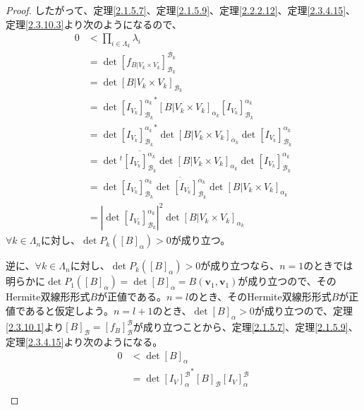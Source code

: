 \documentclass[dvipdfmx]{jsarticle}
\begin{document}
\begin{proof}
したがって、定理\ref{2.1.5.7}、定理\ref{2.1.5.9}、定理\ref{2.2.2.12}、定理\ref{2.3.4.15}、定理\ref{2.3.10.3}より次のようになるので、
\begin{align*}
0 &< \prod_{i \in \varLambda_{k}} \lambda_{i}\\
&= \det\left[ f_{B|V_{k} \times V_{k}} \right]_{\mathcal{B}_{k}}^{\mathcal{B}_{k}}\\
&= \det\left[ B|V_{k} \times V_{k} \right]_{\mathcal{B}_{k}}\\
&= \det{{\left[ I_{V_{k}} \right]_{\mathcal{B}_{k}}^{\alpha_{k}}}^{*}\left[ B|V_{k} \times V_{k} \right]_{\alpha_{k}}\left[ I_{V_{k}} \right]_{\mathcal{B}_{k}}^{\alpha_{k}}}\\
&= \det{\left[ I_{V_{k}} \right]_{\mathcal{B}_{k}}^{\alpha_{k}}}^{*}\det\left[ B|V_{k} \times V_{k} \right]_{\alpha_{k}}\det\left[ I_{V_{k}} \right]_{\mathcal{B}_{k}}^{\alpha_{k}}\\
&= \det{{}^{t}\overline{\left[ I_{V_{k}} \right]_{\mathcal{B}_{k}}^{\alpha_{k}}}}\det\left[ B|V_{k} \times V_{k} \right]_{\alpha_{k}}\det\left[ I_{V_{k}} \right]_{\mathcal{B}_{k}}^{\alpha_{k}}\\
&= \det\left[ I_{V_{k}} \right]_{\mathcal{B}_{k}}^{\alpha_{k}}\overline{\det\left[ I_{V_{k}} \right]_{\mathcal{B}_{k}}^{\alpha_{k}}}\det\left[ B|V_{k} \times V_{k} \right]_{\alpha_{k}}\\
&= \left| \det\left[ I_{V_{k}} \right]_{\mathcal{B}_{k}}^{\alpha_{k}} \right|^{2}\det\left[ B|V_{k} \times V_{k} \right]_{\alpha_{k}}
\end{align*}
$\forall k \in \varLambda_{n}$に対し、$\det{P_{k}\left( [ B]_{\alpha} \right)} > 0$が成り立つ。\par
逆に、$\forall k \in \varLambda_{n}$に対し、$\det{P_{k}\left( [ B]_{\alpha} \right)} > 0$が成り立つなら、$n = 1$のときでは明らかに$\det{P_{1}\left( [ B]_{\alpha} \right)} = \det[ B]_{\alpha} = B\left( \mathbf{v}_{1},\mathbf{v}_{1} \right)$が成り立つので、そのHermite双線形形式$B$が正値である。$n = l$のとき、そのHermite双線形形式$B$が正値であると仮定しよう。$n = l + 1$のとき、$\det[ B]_{\alpha} > 0$が成り立つので、定理\ref{2.3.10.1}より$[ B]_{\mathcal{B}} = \left[ f_{B} \right]_{\mathcal{B}}^{\mathcal{B}}$が成り立つことから、定理\ref{2.1.5.7}、定理\ref{2.1.5.9}、定理\ref{2.3.4.15}より次のようになる。
\begin{align*}
0 &< \det[ B]_{\alpha}\\
&= \det{{\left[ I_{V} \right]_{\alpha}^{\mathcal{B}}}^{*}[ B]_{\mathcal{B}}\left[ I_{V} \right]_{\alpha}^{\mathcal{B}}}\\

\end{align*}
\end{proof}
\end{document}
